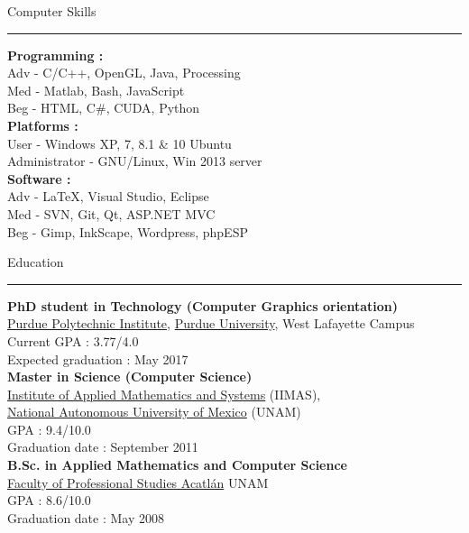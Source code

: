 \documentclass[letterpaper,10pt]{article}
\begin{document}
\begin{minipage}{0.40\textwidth}
\vspace*{1.0cm}
 {\large{Computer Skills}} \\
 \textcolor{Dandelion}{\rule{0.5\textwidth}{0.05in}} 

\textbf{Programming :} \\
Adv - C/C++, OpenGL, Java, Processing \\
Med - Matlab, Bash, JavaScript \\
Beg - HTML, C\#, CUDA, Python\\

\textbf{Platforms :} \\
User - Windows XP, 7, 8.1 \& 10 Ubuntu \\
Administrator - GNU/Linux, Win 2013 server\\

\textbf{Software :} \\
Adv - \LaTeX, Visual Studio, Eclipse \\
Med - SVN, Git, Qt, ASP.NET MVC \\
Beg - Gimp, InkScape,  Wordpress, phpESP\\
\end{minipage}
%
\hspace{0.025\textwidth}
%
\begin{minipage}{0.70\textwidth} 
\vspace*{1.5cm}
{\centering \large{{Education}}} \\
\textcolor{Dandelion}{\rule{0.4\textwidth}{0.05in}}

\textbf{PhD student in Technology (Computer Graphics orientation)} \\
\href{http://polytechnic.purdue.edu/}{Purdue Polytechnic Institute}, \href{http://www.purdue.edu/}{Purdue University}, West Lafayette Campus \\
Current GPA : 3.77/4.0 \\
Expected graduation : May 2017 \\

\textbf{Master in Science (Computer Science)} \\
\href{http://www.iimas.unam.mx/}{Institute of Applied Mathematics and Systems} (IIMAS), \\ \href{http://www.unam.mx/}{National Autonomous University of Mexico} (UNAM) \\
GPA : 9.4/10.0 \\
Graduation date : September 2011 \\

\textbf{B.Sc. in Applied Mathematics and Computer Science} \\
\href{http://www.acatlan.unam.mx/}{Faculty of Professional Studies Acatl\'{a}n} UNAM \\
GPA : 8.6/10.0 \\
Graduation date : May 2008\\
\end{minipage} 
\end{document}
